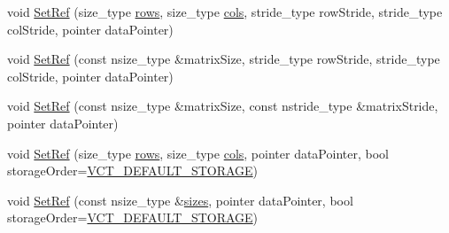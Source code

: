 {\bf }\par
\begin{DoxyCompactItemize}
\item 
void \hyperlink{classvct_dynamic_matrix_ref_a99a2f5a8b4b5f45ce180d5075dd70311}{Set\-Ref} (size\-\_\-type \hyperlink{classvct_dynamic_const_matrix_base_a5eac13be2207ebeb8766cde379d73438}{rows}, size\-\_\-type \hyperlink{classvct_dynamic_const_matrix_base_aa6c51d41a100da49a7e7ac7edb20ecd9}{cols}, stride\-\_\-type row\-Stride, stride\-\_\-type col\-Stride, pointer data\-Pointer)
\item 
void \hyperlink{classvct_dynamic_matrix_ref_a256d14b9ff9aaf1848009129b72630a5}{Set\-Ref} (const nsize\-\_\-type \&matrix\-Size, stride\-\_\-type row\-Stride, stride\-\_\-type col\-Stride, pointer data\-Pointer)
\item 
void \hyperlink{classvct_dynamic_matrix_ref_af0308670e886de7c56ca35d3044dbf58}{Set\-Ref} (const nsize\-\_\-type \&matrix\-Size, const nstride\-\_\-type \&matrix\-Stride, pointer data\-Pointer)
\end{DoxyCompactItemize}

{\bf }\par
\begin{DoxyCompactItemize}
\item 
void \hyperlink{classvct_dynamic_matrix_ref_ace79e39eebb9328e37e48273a11a7d7a}{Set\-Ref} (size\-\_\-type \hyperlink{classvct_dynamic_const_matrix_base_a5eac13be2207ebeb8766cde379d73438}{rows}, size\-\_\-type \hyperlink{classvct_dynamic_const_matrix_base_aa6c51d41a100da49a7e7ac7edb20ecd9}{cols}, pointer data\-Pointer, bool storage\-Order=\hyperlink{vct_forward_declarations_8h_aacdb3b0140beef8a3c2025b808b74a73}{V\-C\-T\-\_\-\-D\-E\-F\-A\-U\-L\-T\-\_\-\-S\-T\-O\-R\-A\-G\-E})
\item 
void \hyperlink{classvct_dynamic_matrix_ref_aa6dfd65e23f0965221b971941944ca03}{Set\-Ref} (const nsize\-\_\-type \&\hyperlink{classvct_dynamic_const_matrix_base_ab8946f5d9d05321fcadf07f65dc314ce}{sizes}, pointer data\-Pointer, bool storage\-Order=\hyperlink{vct_forward_declarations_8h_aacdb3b0140beef8a3c2025b808b74a73}{V\-C\-T\-\_\-\-D\-E\-F\-A\-U\-L\-T\-\_\-\-S\-T\-O\-R\-A\-G\-E})
\end{DoxyCompactItemize}

